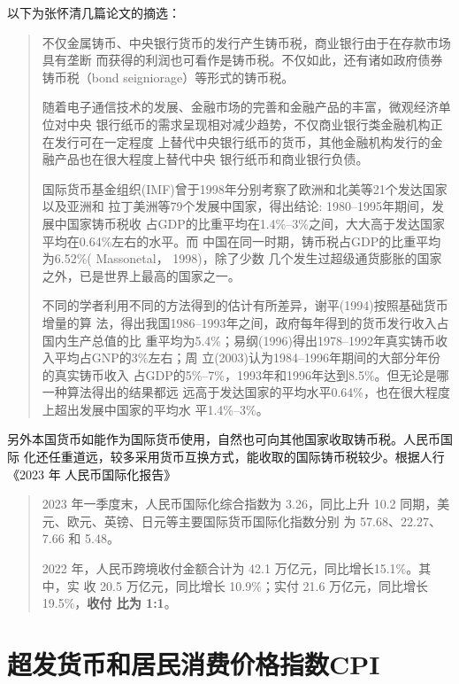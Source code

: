 以下为张怀清几篇论文的摘选：
\begin{quotation}
  不仅金属铸币、中央银行货币的发行产生铸币税，商业银行由于在存款市场具有垄断
  而获得的利润也可看作是铸币税。不仅如此，还有诸如政府债券铸币税（bond
  seigniorage）等形式的铸币税。

  随着电子通信技术的发展、金融市场的完善和金融产品的丰富，微观经济单位对中央
  银行纸币的需求呈现相对减少趋势，不仅商业银行类金融机构正在发行可在一定程度
  上替代中央银行纸币的货币，其他金融机构发行的金融产品也在很大程度上替代中央
  银行纸币和商业银行负债。

  国际货币基金组织(IMF)曾于1998年分别考察了欧洲和北美等21个发达国家以及亚洲和
  拉丁美洲等79个发展中国家，得出结论: 1980–1995年期间，发展中国家铸币税收
  占GDP的比重平均在1.4\%–3\%之间，大大高于发达国家平均在0.64\%左右的水平。而
  中国在同一时期，铸币税占GDP的比重平均为6.52\%( Massonetal， 1998)，除了少数
  几个发生过超级通货膨胀的国家之外，已是世界上最高的国家之一。

  不同的学者利用不同的方法得到的估计有所差异，谢平(1994)按照基础货币增量的算
  法，得出我国1986--1993年之间，政府每年得到的货币发行收入占国内生产总值的比
  重平均为5.4\%；易纲(1996)得出1978--1992年真实铸币收入平均占GNP的3\%左右；周
  立(2003)认为1984--1996年期间的大部分年份的真实铸币收入
  占GDP的5\%--7\%，1993年和1996年达到8.5\%。但无论是哪一种算法得出的结果都远
  远高于发达国家的平均水平0.64\%，也在很大程度上超出发展中国家的平均水
  平1.4\%--3\%。
\end{quotation}

另外本国货币如能作为国际货币使用，自然也可向其他国家收取铸币税。人民币国际
化还任重道远，较多采用货币互换方式，能收取的国际铸币税较少。根据人行《2023 年
人民币国际化报告》
\begin{quotation}
  2023 年一季度末，人民币国际化综合指数为 3.26，同比上升 10.2%
  同期，美元、欧元、英镑、日元等主要国际货币国际化指数分别
  为 57.68、22.27、7.66 和 5.48。

  2022 年，人民币跨境收付金额合计为 42.1 万亿元，同比增长15.1\%。其中，实
  收 20.5 万亿元，同比增长 10.9\%；实付 21.6 万亿元，同比增长 19.5\%，\textbf{收付
    比为 1:1}。
\end{quotation}


\section{超发货币和居民消费价格指数CPI}

